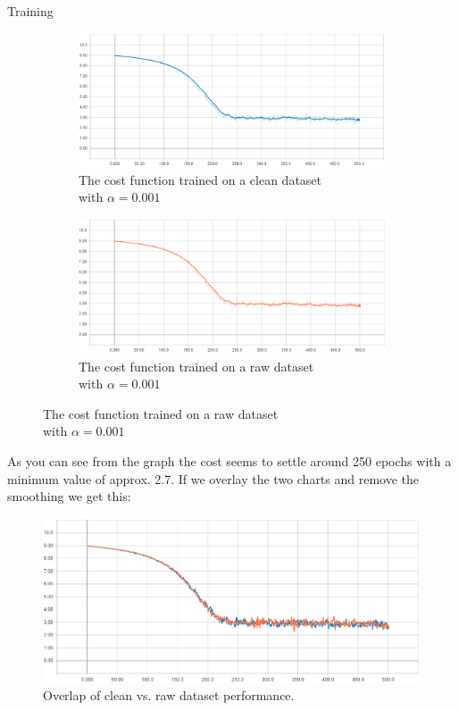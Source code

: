 \documentclass[titlepage]{article}
\begin{document}
Training
\begin{figure}[H]
	\centering
	\begin{subfigure}[b]{0.4\linewidth}
		\centering
		\includegraphics[width=\linewidth]{cost-clean-001.png}
		\caption{The cost function trained on a clean dataset\\with $\alpha = 0.001$}
	\end{subfigure}
	\begin{subfigure}[b]{0.4\linewidth}
		\centering
		\includegraphics[width=\linewidth]{cost-raw-001.png}
		\caption{The cost function trained on a raw dataset\\with $\alpha = 0.001$}
	\end{subfigure}
	\label{fig:ccr001}
\end{figure}
As you can see from the graph the cost seems to settle around 250 epochs with a minimum value of approx. 2.7. If we overlay the two charts and remove the smoothing we get this:
\begin{figure}[H]
	\centering
	\includegraphics[width=120mm]{cost-overlap-001.png}
	\caption{Overlap of clean vs. raw dataset performance.}
	\label{fig:co001}
\end{figure}
\end{document}

